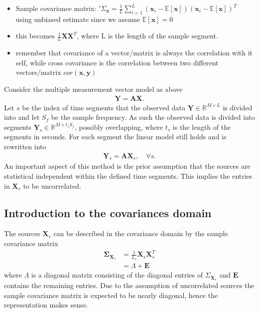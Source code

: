 {\begin{itemize}
\item Sample covariance matrix: $'\Sigma_{\textbf{x}} = \frac{1}{L} \sum_{i=1}^{L}(\textbf{x}_i-\mathbb{E}[\textbf{x}])(\textbf{x}_i-\mathbb{E}[\textbf{x}])^T$ using unbiased estimate since we assume $\mathbb{E}[\textbf{x}]=0$
\item this becomes $\frac{1}{L}\textbf{X}\textbf{X}^T$, where L is the length of the sample segment. 
\item remember that covariance of a vector/matrix is always the correlation with it self, while cross covariance is the correlation between two different vectors/matrix $cor(\textbf{x},\textbf{y})$ 
\end{itemize}
}

Consider the multiple measurement vector model as above
\begin{align*}
\mathbf{Y} = \mathbf{AX}.
\end{align*}
Let $s$ be the index of time segments that the observed data $\mathbf{Y}\in \mathbb{R}^{M\times L}$ is divided into and let $S_f$ be the sample frequency. As such the observed data is divided into segments $\mathbf{Y}_s \in \mathbb{R}^{M \times t_s S_f}$, possibly overlapping, where $t_s$ is the length of the segments in seconds. For each segment the linear model still holds and is rewritten into
\begin{align*}
\mathbf{Y}_s = \mathbf{AX}_s, \quad \forall s.
\end{align*}
An important aspect of this method is the prior assumption that the sources are statistical independent within the defined time segments. This implies the entries in $\textbf{X}_s$ to be uncorrelated. 

\subsection{Introduction to the covariances domain}
The sources $\textbf{X}_s$ can be described in the covariance domain by the sample covariance matrix
\begin{align*}
\boldsymbol{\Sigma}_{\mathbf{X}_s} &= \frac{1}{L_s}\textbf{X}_s\textbf{X}_s^{T}\\
&= \Lambda + \textbf{E}
\end{align*}
where $\Lambda$ is a diagonal matrix consisting of the diagonal entries of $\Sigma_{\textbf{X}_s}$ and $\textbf{E}$ contains the remaining entries. Due to the assumption of uncorrelated sources the sample covariance matrix is expected to be nearly diagonal, hence the representation makes sense. 

